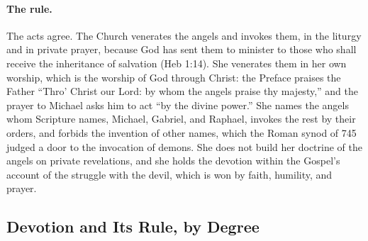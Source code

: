 \paragraph{The rule.} The acts agree. The Church venerates the angels
and invokes them, in the liturgy and in private prayer, because God has
sent them to minister to those who shall receive the inheritance of
salvation (Heb 1:14). She venerates them in her own worship, which is
the worship of God through Christ: the Preface praises the Father
``Thro' Christ our Lord: by whom the angels praise thy majesty,'' and the
prayer to Michael asks him to act ``by the divine power.'' She names the
angels whom Scripture names, Michael, Gabriel, and Raphael, invokes the
rest by their orders, and forbids the invention of other names, which the
Roman synod of 745 judged a door to the invocation of demons. She does not
build her doctrine of the angels on private revelations, and she holds
the devotion within the Gospel's account of the struggle with the devil,
which is won by faith, humility, and prayer.

\subsection{Devotion and Its Rule, by Degree}

